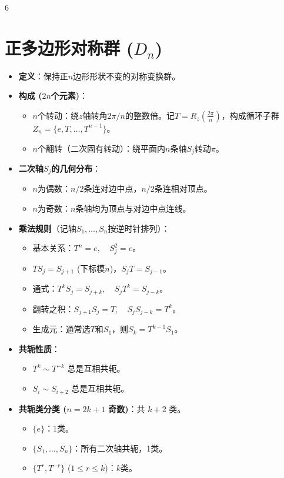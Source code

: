 \documentclass[landscape]{article}
\begin{document}
\begin{multicols*}{6}
\section*{正多边形对称群 ($D_n$)}
\begin{itemize}
  \item \textbf{定义}：保持正$n$边形形状不变的对称变换群。
  \item \textbf{构成 ($2n$个元素)}：
  \begin{itemize}
      \item $n$个转动：绕$z$轴转角$2\pi/n$的整数倍。记$T=R_z(\frac{2\pi}{n})$，构成循环子群$Z_n=\{e, T, \dots, T^{n-1}\}$。
      \item $n$个翻转（二次固有转动）：绕平面内$n$条轴$S_j$转动$\pi$。
  \end{itemize}
  \item \textbf{二次轴$S_j$的几何分布}：
  \begin{itemize}
      \item $n$为偶数：$n/2$条连对边中点，$n/2$条连相对顶点。
      \item $n$为奇数：$n$条轴均为顶点与对边中点连线。
  \end{itemize}
  \item \textbf{乘法规则}（记轴$S_1,\dots,S_n$按逆时针排列）：
  \begin{itemize}
      \item 基本关系：$T^n=e,\quad S_j^2=e$。
      \item $TS_j = S_{j+1}$ (下标模$n$)，$S_jT = S_{j-1}$。
      \item 通式：$T^k S_j = S_{j+k},\quad S_j T^k = S_{j-k}$。
      \item 翻转之积：$S_{j+1} S_j = T,\quad S_j S_{j-k} = T^k$。
      \item 生成元：通常选$T$和$S_1$，则$S_k = T^{k-1}S_1$。
  \end{itemize}
  \item \textbf{共轭性质}：
  \begin{itemize}
      \item $T^k \sim T^{-k}$ 总是互相共轭。
      \item $S_i \sim S_{i+2}$ 总是互相共轭。
  \end{itemize}
  \item \textbf{共轭类分类 ($n=2k+1$ 奇数)}：共 $k+2$ 类。
  \begin{itemize}
      \item $\{e\}$：1类。
      \item $\{S_1, \dots, S_n\}$：所有二次轴共轭，1类。
      \item $\{T^r, T^{-r}\}$ ($1\le r \le k$)：$k$类。

\end{itemize}
\end{itemize}
\end{multicols*}
\end{document}
